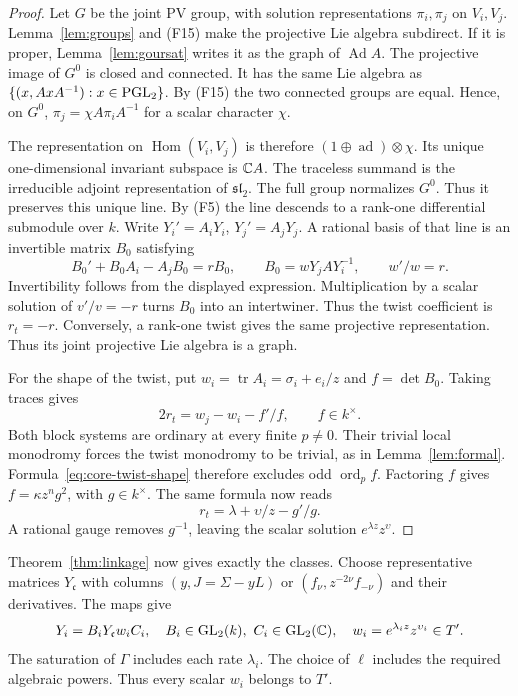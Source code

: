 \begin{proof}
Let $G$ be the joint PV group, with solution representations $\pi_i,
\pi_j$ on $V_i,V_j$. Lemma~\ref{lem:groups} and (F15) make the
projective Lie algebra subdirect. If it is proper,
Lemma~\ref{lem:goursat} writes it as the graph of $\operatorname{Ad}A$.
The projective image of $G^0$ is closed and connected. It has the same
Lie algebra as $\{(x,AxA^{-1}):x\in\operatorname{PGL}_2\}$.
By (F15) the two connected groups are equal. Hence, on $G^0$,
$\pi_j=\chi A\pi_iA^{-1}$ for a scalar character $\chi$.

The representation on $\operatorname{Hom}(V_i,V_j)$ is therefore
$(1\oplus\operatorname{ad})\otimes\chi$.
Its unique one-dimensional invariant subspace is $\mathbb{C} A$. The traceless summand is the irreducible adjoint representation of $\mathfrak{sl}_2$.
The full group normalizes $G^0$. Thus it preserves this unique line.
By (F5) the line descends to a rank-one differential submodule over $k$.
Write $Y_i'=A_iY_i$, $Y_j'=A_jY_j$. A rational basis of that line is
an invertible matrix $B_0$ satisfying
\[
 B_0'+B_0A_i-A_jB_0=rB_0,\qquad
 B_0=wY_jAY_i^{-1},\qquad w'/w=r.
\]
Invertibility follows from the displayed expression. Multiplication by
a scalar solution of $v'/v=-r$ turns $B_0$ into an intertwiner.
Thus the twist coefficient is $r_t=-r$.
Conversely, a rank-one twist gives the same projective representation. Thus its joint projective Lie algebra is a graph.

For the shape of the twist, put $w_i=\operatorname{tr}A_i
=\sigma_i+e_i/z$ and $f=\det B_0$. Taking traces gives
\begin{equation}\label{eq:core-twist-shape}
2r_t=w_j-w_i-f'/f,\qquad f\in k^\times.
\end{equation}
Both block systems are ordinary at every finite $p\ne0$.
Their trivial local monodromy forces the twist monodromy to be trivial,
as in Lemma~\ref{lem:formal}. Formula~\eqref{eq:core-twist-shape}
therefore excludes odd $\operatorname{ord}_p f$.
Factoring $f$ gives $f=\kappa z^ng^2$, with $g\in k^\times$.
The same formula now reads
\[
 r_t=\lambda+\upsilon/z-g'/g.
\]
A rational gauge removes $g^{-1}$, leaving the scalar solution
$e^{\lambda z}z^\upsilon$.
\end{proof}
Theorem~\ref{thm:linkage} now gives exactly the classes. Choose representative
matrices $Y_{\mathfrak c}$ with columns $(y,J=\Sigma-yL)$ or
$(f_\nu,z^{-2\nu}f_{-\nu})$ and their derivatives. The maps give
\begin{equation}\label{eq:core-block-transport}
Y_i=B_iY_{\mathfrak c}w_iC_i,\quad B_i\in\GL_2(k),\ C_i\in\GL_2(\C),\quad
w_i=e^{\lambda_i z}z^{\upsilon_i}\in T'.
\end{equation}
The saturation of $\Gamma$ includes each rate $\lambda_i$.
The choice of $\ell$ includes the required algebraic powers. Thus every
scalar $w_i$ belongs to $T'$.

